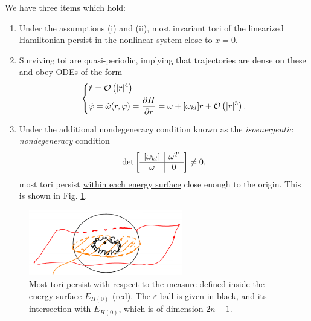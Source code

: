 \begin{theorem}
	We have three items which hold:
	\begin{enumerate}
		\item Under the assumptions (i) and (ii), most invariant tori of the linearized Hamiltonian persist in the nonlinear system close to $x=0$.
		\item Surviving toi are quasi-periodic, implying that trajectories are dense on these and obey ODEs of the form
			\begin{align}
				\begin{dcases}
				\dot{r} = \mathcal{O}\left( |r|^{4}\right) \\
				\dot{\varphi} = \tilde{\omega} (r, \varphi) = \frac{\partial H}{\partial r} = \omega + [\omega_{kl}]r + \mathcal{O}\left(|r|^{3}\right).
				\end{dcases}
			\end{align}
		\item Under the additional nondegeneracy condition known as the \emph{isoenergentic nondegeneracy} condition
			\begin{align}
				\det\left[
					\begin{array}{c | c}
						[\omega_{kl}] & \omega^{T} \\
						\hline
						\omega & 0
					\end{array}
				\right]
				\neq 0,
			\end{align}
			most tori persist \underline{within each energy surface} close enough to the origin. This is shown in Fig. \ref{fig:persisting_tori_energy}.	
	\end{enumerate}
\begin{figure}[h!]
	\centering
	\includegraphics[width=0.6\textwidth]{figures/ch8/21persisiting_tori_energy.png}
	\caption{Most tori persist with respect to the measure defined inside the energy surface $E_{H(0)}$ (red). The $\varepsilon$-ball is given in black, and its intersection with $E_{H(0)}$, which is of dimension $2n-1$.}
	\label{fig:persisting_tori_energy}
\end{figure}
\end{theorem}

